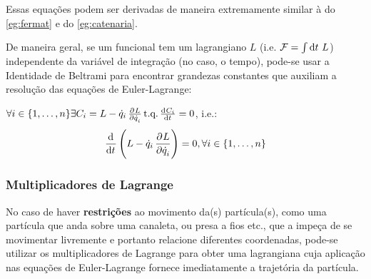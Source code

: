 Essas equações podem ser derivadas de maneira extremamente similar à do
\autoref{eg:fermat} e do \autoref{eg:catenaria}.

De maneira geral, se um funcional tem um lagrangiano $L$ (i.e. $\mathcal{F}=\int
\dif t~L$) independente da variável de integração (no caso, o tempo), pode-se
usar a Identidade de Beltrami para encontrar grandezas constantes que auxiliam
a resolução das equações de Euler-Lagrange:

\begin{namedeq}
    $\forall i \in \{1, \ldots, n\} \exists C_i = L - \dot q_i \tpd{L}{\dot
    q_i} \text{t.q.} \tod{C_i}{t} = 0$, i.e.:
    \begin{equation*}
        \label{eq:beltrami}
        \dod{}{t} \del{L - \dot q_i \dpd{L}{\dot q_i}} = 0, \forall i \in \{1,
        \ldots, n\}
    \end{equation*}
\end{namedeq}

\subsubsection{Multiplicadores de Lagrange}
\label{sssec:lagrange_multipliers}

No caso de haver \textbf{restrições} ao movimento da(s) partícula(s), como uma
partícula que anda sobre uma canaleta, ou presa a fios etc., que a impeça de se
movimentar livremente e portanto relacione diferentes coordenadas, pode-se
utilizar os multiplicadores de Lagrange para obter uma lagrangiana cuja
aplicação nas equações de Euler-Lagrange fornece imediatamente a trajetória da
partícula.

